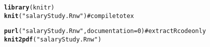 \documentclass{article}\usepackage{graphicx, color}
\makeatletter
\newcommand{\hlfunctioncall}[1]{\textcolor[rgb]{0.501960784313725,0,0.329411764705882}{\textbf{#1}}}%
\newcommand{\hlstring}[1]{\textcolor[rgb]{0.6,0.6,1}{#1}}%
\newenvironment{kframe}{%
 \def\at@end@of@kframe{}%
 \ifinner\ifhmode%
  \def\at@end@of@kframe{\end{minipage}}%
  \begin{minipage}{\columnwidth}%
 \fi\fi%
 \def\FrameCommand##1{\hskip\@totalleftmargin \hskip-\fboxsep
 \colorbox{shadecolor}{##1}\hskip-\fboxsep
     \hskip-\linewidth \hskip-\@totalleftmargin \hskip\columnwidth}%
 \MakeFramed {\advance\hsize-\width
   \@totalleftmargin\z@ \linewidth\hsize
   \@setminipage}}%
 {\par\unskip\endMakeFramed%
 \at@end@of@kframe}
\newenvironment{knitrout}{}{} %
\makeatother
\begin{document}
\begin{knitrout}
\color{fgcolor}\begin{kframe}
\begin{alltt}
\hlfunctioncall{library}(knitr)
\hlfunctioncall{knit}(\hlstring{"salaryStudy.Rnw"})  # compile to tex
\end{alltt}


{\ttfamily\noindent\bfseries\color{errorcolor}{\#\# Error: duplicated label 'setup'}}\begin{alltt}
\hlfunctioncall{purl}(\hlstring{"salaryStudy.Rnw"}, documentation = 0)  # extract R code only
\hlfunctioncall{knit2pdf}(\hlstring{"salaryStudy.Rnw"})
\end{alltt}


{\ttfamily\noindent\bfseries\color{errorcolor}{\#\# Error: duplicated label 'setup'}}\end{kframe}
\end{knitrout}
\end{document}
